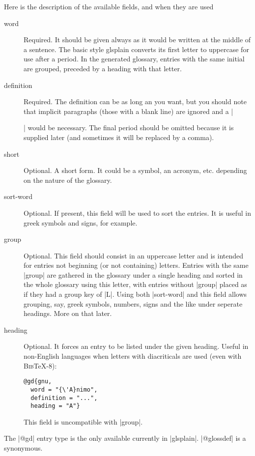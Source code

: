 \documentclass{ltxguide}
\newcommand{\bibTeX}{\textsc{Bib}\TeX}
\begin{document}
Here is the description of the available fields, and when they are used
\begin{description}
\item[word] Required.  It should be given always as it would be 
  written at the middle of a sentence.  The basic style 
  \textsf{glsplain} converts its first letter to uppercase for use after 
  a period.  In the generated glossary, entries with the 
  same initial are grouped, preceded by a heading with that letter.

\item[definition] Required.  The definition can be as long an you 
  want, but you should note that implicit paragraphs (those with a 
  blank line) are ignored and a |\par| would be necessary.  The final 
  period should be omitted because it is supplied later (and sometimes it 
  will be replaced by a comma).

\item[short] Optional. A short form. It could be a symbol, an
  acronym, etc. depending on the nature of the glossary.

\item[sort-word] Optional.  If present, this field will be used to 
sort the entries.  It is useful in greek symbols and signs, for 
example.

\item[group] Optional.  This field should consist in an uppercase 
  letter and is intended for entries not beginning (or not containing) 
  letters.  Entries with the same |group| are gathered in the glossary 
  under a single heading and sorted in the whole glossary using this 
  letter, with entries without |group| placed as if they had a group 
  key of |L|.  Using both |sort-word| and this field allows grouping, 
  say, greek symbols, numbers, signs and the like under seperate 
  headings.  More on that later.

\item[heading] Optional. It forces an entry to be listed under the
  given heading. Useful in non-English languages when
  letters with diacriticals are used (even with \bibTeX-8):
\begin{verbatim}
@gd{gnu,
  word = "{\'A}nimo",
  definition = "...",
  heading = "A"}
\end{verbatim}
This field is uncompatible with |group|.

\end{description}

The |@gd| entry type is the only available currently in |glsplain|.  
|@glossdef| is a synonymous.
\end{document}
